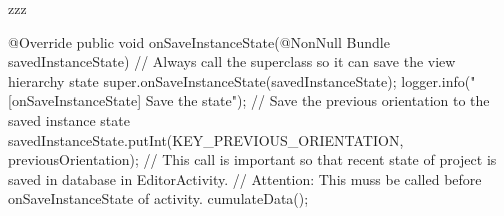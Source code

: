 zzz

@Override
    public void onSaveInstanceState(@NonNull Bundle savedInstanceState) {
        // Always call the superclass so it can save the view hierarchy state
        super.onSaveInstanceState(savedInstanceState);
        logger.info("[onSaveInstanceState] Save the state");
        // Save the previous orientation to the saved instance state
        savedInstanceState.putInt(KEY_PREVIOUS_ORIENTATION, previousOrientation);
        // This call is important so that recent state of project is saved in database in EditorActivity.
        // Attention: This muss be called before onSaveInstanceState of activity.
        cumulateData();
    }
